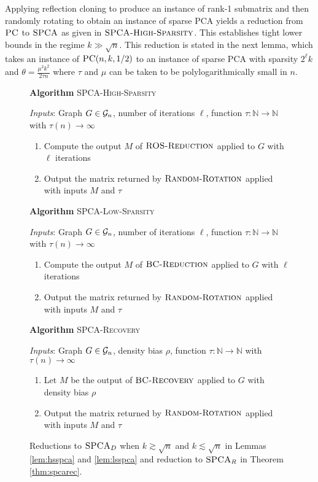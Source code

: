 Applying reflection cloning to produce an instance of rank-1 submatrix and then randomly rotating to obtain an instance of sparse PCA yields a reduction from $\textsc{PC}$ to $\textsc{SPCA}$ as given in $\textsc{SPCA-High-Sparsity}$. This establishes tight lower bounds in the regime $k \gg \sqrt{n}$. This reduction is stated in the next lemma, which takes an instance of $\textsc{PC}(n, k, 1/2)$ to an instance of sparse PCA with sparsity $2^\ell k$ and $\theta = \frac{\mu^2 k^2}{2\tau n}$ where $\tau$ and $\mu$ can be taken to be polylogarithmically small in $n$.

\begin{figure}[t!]
\begin{algbox}
\textbf{Algorithm} \textsc{SPCA-High-Sparsity}

\vspace{2mm}

\textit{Inputs}: Graph $G \in \mathcal{G}_n$, number of iterations $\ell$, function $\tau : \mathbb{N} \to \mathbb{N}$ with $\tau(n) \to \infty$
\begin{enumerate}
\item Compute the output $M$ of $\textsc{ROS-Reduction}$ applied to $G$ with $\ell$ iterations
\item Output the matrix returned by $\textsc{Random-Rotation}$ applied with inputs $M$ and $\tau$
\end{enumerate}
\vspace{2mm}
\textbf{Algorithm} \textsc{SPCA-Low-Sparsity}

\vspace{2mm}

\textit{Inputs}: Graph $G \in \mathcal{G}_n$, number of iterations $\ell$, function $\tau : \mathbb{N} \to \mathbb{N}$ with $\tau(n) \to \infty$
\begin{enumerate}
\item Compute the output $M$ of $\textsc{BC-Reduction}$ applied to $G$ with $\ell$ iterations
\item Output the matrix returned by $\textsc{Random-Rotation}$ applied with inputs $M$ and $\tau$
\end{enumerate}
\vspace{2mm}
\textbf{Algorithm} \textsc{SPCA-Recovery}

\vspace{2mm}

\textit{Inputs}: Graph $G \in \mathcal{G}_n$, density bias $\rho$, function $\tau : \mathbb{N} \to \mathbb{N}$ with $\tau(n) \to \infty$
\begin{enumerate}
\item Let $M$ be the output of $\textsc{BC-Recovery}$ applied to $G$ with density bias $\rho$
\item Output the matrix returned by $\textsc{Random-Rotation}$ applied with inputs $M$ and $\tau$
\end{enumerate}
\vspace{1mm}
\end{algbox}
\caption{Reductions to $\textsc{SPCA}_D$ when $k \gtrsim \sqrt{n}$ and $k \lesssim \sqrt{n}$ in Lemmas \ref{lem:hsspca} and \ref{lem:lsspca} and reduction to $\textsc{SPCA}_{R}$ in Theorem \ref{thm:spcarec}.}
\label{fig:randrot}
\end{figure}

